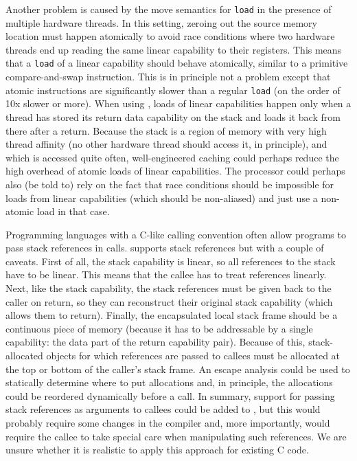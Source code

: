 Another problem is caused by the move semantics for \texttt{load} in the presence of multiple hardware threads.
In this setting, zeroing out the source memory location must happen atomically to avoid race conditions where two hardware threads end up reading the same linear capability to their registers.
This means that a \texttt{load} of a linear capability should behave atomically, similar to a primitive compare-and-swap instruction.
This is in principle not a problem except that atomic instructions are significantly slower than a regular \texttt{load} (on the order of 10x slower or more).
When using \stktokens{}, loads of linear capabilities happen only when a thread has stored its return data capability on the stack and loads it back from there after a return.
Because the stack is a region of memory with very high thread affinity (no other hardware thread should access it, in principle), and which is accessed quite often, well-engineered caching could perhaps reduce the high overhead of atomic loads of linear capabilities.
The processor could perhaps also (be told to) rely on the fact that race conditions should be impossible for loads from linear capabilities (which should be non-aliased) and just use a non-atomic load in that case.


\begin{jversion}
  Programming languages with a C-like calling convention often allow programs to pass stack references in calls.
  \stktokens{} supports stack references but with a couple of caveats.
  First of all, the stack capability is linear, so all references to the stack have to be linear.
  This means that the callee has to treat references linearly.
  Next, like the stack capability, the stack references must be given back to the caller on return, so they can reconstruct their original stack capability (which allows them to return). 
  Finally, the encapsulated local stack frame should be a continuous piece of memory (because it has to be addressable by a single capability: the data part of the return capability pair).
  Because of this, stack-allocated objects for which references are passed to callees must be allocated at the top or bottom of the caller's stack frame.
  An escape analysis could be used to statically determine where to put allocations and, in principle, the allocations could be reordered dynamically before a call.
  In summary, support for passing stack references as arguments to callees could be added to \stktokens{}, but this would probably require some changes in the compiler and, more importantly, would require the callee to take special care when manipulating such references.
  We are unsure whether it is realistic to apply this approach for existing C code.
\end{jversion}


